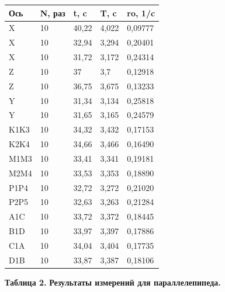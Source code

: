    


\begin{table}[H]
\centering
\begin{tabular}{|l|l|l|l|l|}
\hline
Ось  & N, раз & t, c  & T, c  & ro, 1/c \\ \hline
X    & 10     & 40,22 & 4,022 & 0,09777 \\ \hline
X    & 10     & 32,94 & 3,294 & 0,20401 \\ \hline
X    & 10     & 31,72 & 3,172 & 0,24314 \\ \hline
Z    & 10     & 37    & 3,7   & 0,12918 \\ \hline
Z    & 10     & 36,75 & 3,675 & 0,13233 \\ \hline
Y    & 10     & 31,34 & 3,134 & 0,25818 \\ \hline
Y    & 10     & 31,65 & 3,165 & 0,24579 \\ \hline
K1K3 & 10     & 34,32 & 3,432 & 0,17153 \\ \hline
K2K4 & 10     & 34,66 & 3,466 & 0,16490 \\ \hline
M1M3 & 10     & 33,41 & 3,341 & 0,19181 \\ \hline
M2M4 & 10     & 33,53 & 3,353 & 0,18890 \\ \hline
P1P4 & 10     & 32,72 & 3,272 & 0,21020 \\ \hline
P2P5 & 10     & 32,63 & 3,263 & 0,21284 \\ \hline
A1C  & 10     & 33,72 & 3,372 & 0,18445 \\ \hline
B1D  & 10     & 33,97 & 3,397 & 0,17886 \\ \hline
C1A  & 10     & 34,04 & 3,404 & 0,17735 \\ \hline
D1B  & 10     & 33,87 & 3,387 & 0,18106 \\ \hline
\end{tabular}
\begin{flushright}
{\scriptsize \textbf{Таблица 2.} \textbf {Результаты измерений для параллелепипеда.}}
\end{flushright}
\end{table}



